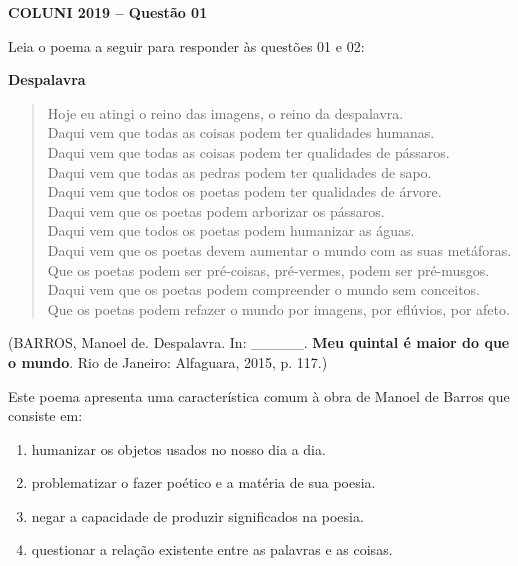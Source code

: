 \textbf{COLUNI 2019 -- Questão 01}\par\medskip Leia o poema a seguir para responder às questões 01 e 02:

\begin{center}\textbf{Despalavra}\end{center}
\begin{verse}
Hoje eu atingi o reino das imagens, o reino da despalavra.\\
Daqui vem que todas as coisas podem ter qualidades humanas.\\
Daqui vem que todas as coisas podem ter qualidades de pássaros.\\
Daqui vem que todas as pedras podem ter qualidades de sapo.\\
Daqui vem que todos os poetas podem ter qualidades de árvore.\\
Daqui vem que os poetas podem arborizar os pássaros.\\
Daqui vem que todos os poetas podem humanizar as águas.\\
Daqui vem que os poetas devem aumentar o mundo com as suas metáforas.\\
Que os poetas podem ser pré-coisas, pré-vermes, podem ser pré-musgos.\\
Daqui vem que os poetas podem compreender o mundo sem conceitos.\\
Que os poetas podem refazer o mundo por imagens, por eflúvios, por afeto.
\end{verse}
\begin{center}(BARROS, Manoel de. Despalavra. In: \_\_\_\_\_. \textbf{Meu quintal é maior do que o mundo}. Rio de Janeiro: Alfaguara, 2015, p. 117.)\end{center}

Este poema apresenta uma característica comum à obra de Manoel de Barros que consiste em:\begin{enumerate}
\item humanizar os objetos usados no nosso dia a dia.
\item problematizar o fazer poético e a matéria de sua poesia.
\item negar a capacidade de produzir significados na poesia.
\item questionar a relação existente entre as palavras e as coisas.\end{enumerate}
